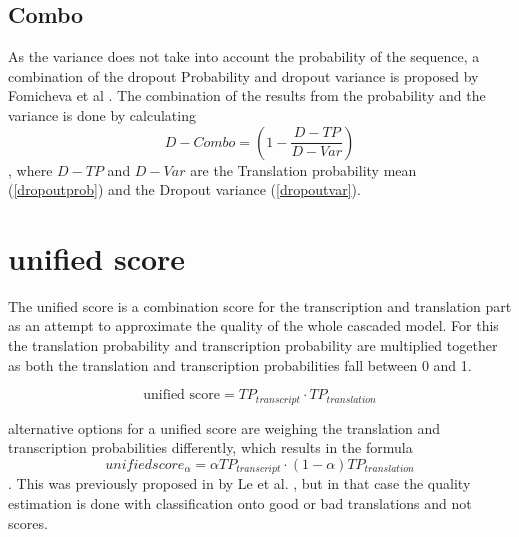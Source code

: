 \subsection{Combo}
As the variance does not take into account the probability of the sequence, a combination of the dropout Probability and dropout variance is proposed by Fomicheva et al \cite{fomicheva2020unsupervised}. 
The combination of the results from the probability and the variance is done by calculating $$D-Combo=(1-\frac{D-TP}{D-Var})\label{formula:Dropoutcombo}$$, where $D-TP$ and $D-Var$ are the Translation probability mean (\ref{dropoutprob}) and the Dropout variance (\ref{dropoutvar}).



\section{unified score}
The unified score is a combination score for the transcription and translation part as an attempt to approximate the quality of the whole cascaded model. 
For this the translation probability and transcription probability are multiplied together as both the translation and transcription probabilities fall between 0 and 1. 

$$\text{unified score}= TP_{transcript}\cdot TP_{translation}$$

alternative options for a unified score are weighing the translation and transcription probabilities differently, which results in the formula $$unifiedscore_\alpha= \alpha TP_{transcript} \cdot (1-\alpha)TP_{translation}$$. 
This was previously proposed in by Le et al. \cite{le2016automatic}, but in that case the quality estimation is done with classification onto good or bad translations and not scores.

